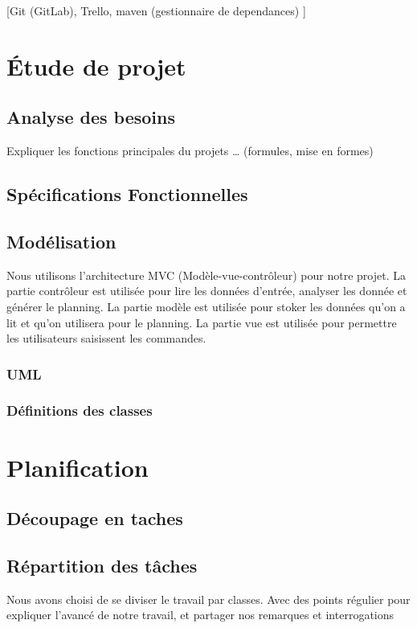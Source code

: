 \documentclass{polytech/polytech}
\begin{document}
	[Git (GitLab), Trello, maven (gestionnaire de dependances) ]

	\chapter{Étude de projet}
	\section{Analyse des besoins}
	Expliquer les fonctions principales du projets … (formules, mise en formes)

	\section{Spécifications Fonctionnelles}

	\section{Modélisation}
	Nous utilisons l'architecture MVC (Modèle-vue-contrôleur) pour notre projet. La partie contrôleur est utilisée pour lire les données d'entrée, analyser les donnée et générer le planning. La partie modèle est utilisée pour stoker les données qu'on a lit et qu'on utilisera pour le planning. La partie vue est utilisée pour permettre les utilisateurs saisissent les commandes.

	\subsection{UML}

	\subsection{Définitions des classes}

	\chapter{Planification}

	\section{Découpage en taches}

	\section{Répartition des tâches}

	Nous avons choisi de se diviser le travail par classes.
	Avec des points régulier pour expliquer l'avancé de notre travail, et partager nos remarques et
	interrogations
\end{document}
